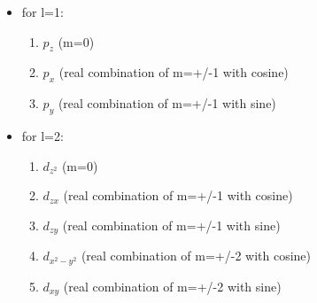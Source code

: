 \documentclass[landscape]{foils}
\begin{document}
\begin{itemize}
\item for l=1:
\begin{enumerate}
  \item $p_z$     (m=0)
  \item $p_x$     (real combination of m=+/-1 with cosine)
  \item $p_y$     (real combination of m=+/-1 with sine)
\end{enumerate}
\item for l=2:
\begin{enumerate}
  \item $d_{z^2}$    (m=0)
  \item $d_{zx}$    (real combination of m=+/-1 with cosine)
  \item $d_{zy}$    (real combination of m=+/-1 with sine)
  \item $d_{x^2-y^2}$ (real combination of m=+/-2 with cosine)
  \item $d_{xy}$    (real combination of m=+/-2 with sine)
\end{enumerate}
\end{itemize}
\end{document}
